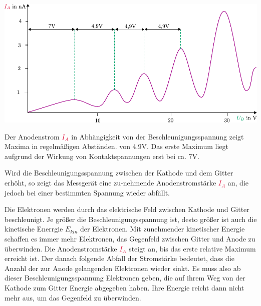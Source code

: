 \documentclass{tuftebook}
\begin{document}
    \begin{marginfigure}
        \centering
        \includegraphics[width=\linewidth]{figures/frankhertzspannung.pdf}
        \caption{Der Anodenstrom \textcolor{crimson}{$I_A$} in Abhängigkeit von der Beschleunigungsspannung  zeigt Maxima in regelmäßigen Abständen. von 4.9V. Das erste Maximum liegt aufgrund der Wirkung von Kontaktspannungen erst bei ca. 7V.}
        \label{fig:frankhertzkurve}
    \end{marginfigure}
    \begin{beobachtung}
        \vspace{-1em}
        Wird die Beschleunigungsspannung  zwischen der Kathode und dem Gitter erhöht, so zeigt das Messgerät eine zu-nehmende Anodenstromstärke \textcolor{crimson}{$I_A$} an, die jedoch bei einer bestimmten Spannung wieder abfällt. 
    \end{beobachtung}
    \begin{deutung}
        \vspace{-1em}
        Die Elektronen werden durch das elektrische Feld zwischen Kathode und Gitter beschleunigt. Je größer die Beschleunigungsspannung  ist, desto größer ist auch die kinetische Enerrgie $E_{kin}$ der Elektronen. Mit zunehmender kinetischer Energie schaffen es immer mehr Elektronen, das Gegenfeld zwischen Gitter und Anode zu überwinden. Die Anodenstromstärke \textcolor{crimson}{$I_A$} steigt an, bis das erste relative Maximum erreicht ist. Der danach folgende Abfall der Stromstärke bedeutet, dass die Anzahl der zur Anode gelangenden Elektronen wieder sinkt. Es muss also ab dieser Beschleunigungsspannung Elektronen geben, die auf ihrem Weg von der Kathode zum Gitter Energie abgegeben haben. Ihre Energie reicht dann nicht mehr aus, um das Gegenfeld zu überwinden.
    \end{deutung}
\end{document}
